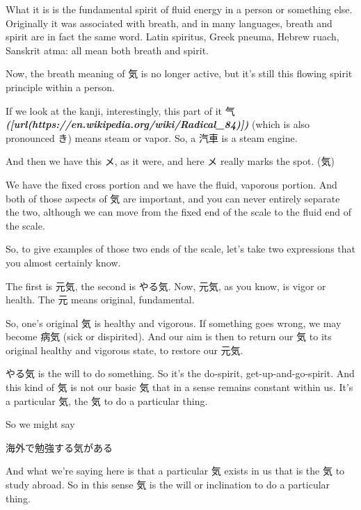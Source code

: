 {}

What it is is the fundamental spirit of fluid energy in a person or something else. Originally it was associated with breath, and in many languages, breath and spirit are in fact the same word. Latin spiritus, Greek pneuma, Hebrew ruach, Sanskrit atma: all mean both breath and spirit.

Now, the breath meaning of 気 is no longer active, but it's still this flowing spirit principle within a person.

\thinrule

If we look at the kanji, interestingly, this part of it 气 {\bf {\em ([url(https://en.wikipedia.org/wiki/Radical_84)])}} (which is also pronounced き) means steam or vapor. So, a 汽車 is a steam engine.

And then we have this メ, as it were, and here メ really marks the spot. (気)\crlf
{}

We have the fixed cross portion and we have the fluid, vaporous portion. And both of those aspects of 気 are important, and you can never entirely separate the two, although we can move from the fixed end of the scale to the fluid end of the scale.

So, to give examples of those two ends of the scale, let's take two expressions that you almost certainly know.

\thinrule

The first is 元気, the second is やる気. Now, 元気, as you know, is vigor or health. The 元 means original, fundamental.

{}

So, one's original 気 is healthy and vigorous. If something goes wrong, we may become 病気 (sick or dispirited). And our aim is then to return our 気 to its original healthy and vigorous state, to restore our 元気.

やる気 is the will to do something. So it's the do-spirit, get-up-and-go-spirit. And this kind of 気 is not our basic 気 that in a sense remains constant within us. It's a particular 気, the 気 to do a particular thing.

So we might say

海外で勉強する気がある

{}

And what we're saying here is that a particular 気 exists in us that is the 気 to study abroad. So in this sense 気 is the will or inclination to do a particular thing.

